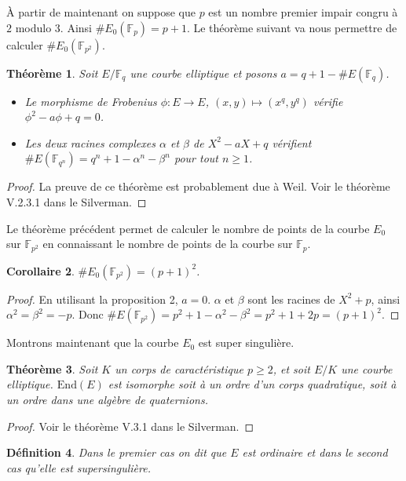 \documentclass{article}
\theoremstyle{plain}%
\newtheorem{thm}{Théorème}[section]
\newtheorem{deff}[thm]{Définition}
\newtheorem{cor}[thm]{Corollaire}
\theoremstyle{definition}%
\newcommand{\Fp}{\mathbb{F}_{p}}
\newcommand{\Fq}{\mathbb{F}_{p^2}}
\newcommand{\F}{\mathbb{F}}
\begin{document}
À partir de maintenant on suppose que $p$ est un nombre premier impair congru à $2$ modulo $3$. 
Ainsi $\#E_0(\Fp) = p+1$. 
Le théorème suivant va nous permettre de calculer $\#E_0(\F_{p^2})$. 

\begin{thm}
  \label{weil}
  Soit $E/\F_q$ une courbe elliptique et posons $a = q + 1 - \#E(\F_q)$.
  \begin{itemize}
    \item Le morphisme de Frobenius $\phi \colon E \to E$, $(x, y) \mapsto (x^q, y^q)$ vérifie $\phi^2 - a\phi + q = 0$.
    \item Les deux racines complexes $\alpha$ et $\beta$ de $X^2 - aX + q$ vérifient $\#E(\F_{q^n}) = q^n + 1 - \alpha^n - \beta^n$ pour tout $n\ge1$. 
  \end{itemize}
\end{thm}

\begin{proof}
  La preuve de ce théorème est probablement due à Weil. Voir le théorème V.2.3.1 dans le Silverman.
\end{proof}

Le théorème précédent permet de calculer le nombre de points de la courbe $E_0$ sur $\Fq$ en connaissant le nombre de points de la courbe sur $\Fp$.

\begin{cor}
$\#E_0(\Fq) = (p+1)^2$.
\end{cor}

\begin{proof}
  En utilisant la proposition 2, $a = 0$. $\alpha$ et $\beta$ sont les racines de $X^2 + p$, ainsi $\alpha^2 = \beta^2 = -p$. Donc $\#E(\Fq) = p^2 + 1 - \alpha^2 - \beta^2 = p^2 + 1 + 2p = (p+1)^2$.
\end{proof}


Montrons maintenant que la courbe $E_0$ est super singulière.

\begin{thm}
  Soit $K$ un corps de caractéristique $p\ge 2$, et soit $E/K$ une courbe elliptique. $\mathrm{End}(E)$ est isomorphe soit à un ordre d'un corps quadratique, soit à un ordre dans une algèbre de quaternions. 
\end{thm}

\begin{proof}
  Voir le théorème V.3.1 dans le Silverman.
\end{proof}

\begin{deff}
  Dans le premier cas on dit que $E$ est \textit{ordinaire} et dans le second cas qu'elle est \textit{supersingulière}.
\end{deff}
\end{document}
